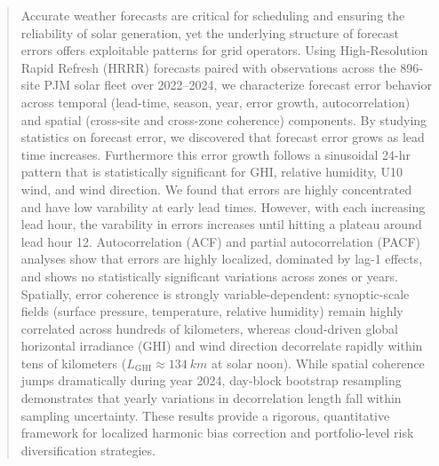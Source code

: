 \begin{abstract}
Accurate weather forecasts are critical for scheduling and ensuring the reliability of solar generation, yet the underlying structure of forecast errors offers exploitable patterns for grid operators. Using High-Resolution Rapid Refresh (HRRR) forecasts paired with observations across the 896-site PJM solar fleet over 2022–2024, we characterize forecast error behavior across temporal (lead-time, season, year, error growth, autocorrelation) and spatial (cross-site and cross-zone coherence) components. By studying statistics on forecast error, we discovered that forecast error grows as lead time increases. Furthermore this error growth follows a sinusoidal 24-hr pattern that is statistically significant for GHI, relative humidity, U10 wind, and wind direction. We found that errors are highly concentrated and have low varability at early lead times. However, with each increasing lead hour, the varability in errors increases until hitting a plateau around lead hour 12. Autocorrelation (ACF) and partial autocorrelation (PACF) analyses show that errors are highly localized, dominated by lag-1 effects, and shows no statistically significant variations across zones or years. Spatially, error coherence is strongly variable-dependent: synoptic-scale fields (surface pressure, temperature, relative humidity) remain highly correlated across hundreds of kilometers, whereas cloud-driven global horizontal irradiance (GHI) and wind direction decorrelate rapidly within tens of kilometers ($L_{\text{GHI}} \approx \SI{134}{km}$ at solar noon). While spatial coherence jumps dramatically during year 2024, day-block bootstrap resampling demonstrates that yearly variations in decorrelation length fall within sampling uncertainty. These results provide a rigorous, quantitative framework for localized harmonic bias correction and portfolio-level risk diversification strategies.
\end{abstract}